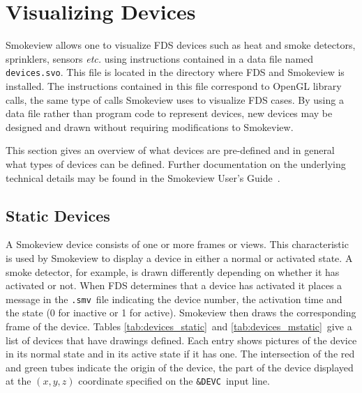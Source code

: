 %
%
\newcommand{\devicewidth}{1.5in}
\newcommand{\boxwidth}{2.5in}
\newcommand{\incgraphics}[1]{
\parbox[c]{\devicewidth}{
\vspace{0.01in}
\texttt{[image: \#1]}
\vspace{0.01in}
}
}


\section{Visualizing Devices}

Smokeview allows one to visualize FDS devices such as heat and smoke detectors,
sprinklers, sensors {\em etc.} using instructions contained in a
data file named {\tt devices.svo}.
This file is located in the directory where FDS and Smokeview is installed.
The instructions contained in this file correspond to OpenGL library calls,
the same type of calls Smokeview uses to visualize FDS cases.
By using a data file rather than program code to represent devices, new
devices may be designed and drawn without requiring modifications to Smokeview.



This section gives an overview of what devices are pre-defined and in general what types of devices can be defined.  Further documentation on the underlying technical details may be found in the Smokeview User's Guide~\cite{Smokeview_Users_Guide_5}.

\subsection{Static Devices}

A Smokeview device consists of one or more frames or views.  This characteristic is used by Smokeview to display a device in either a normal or activated state.  A smoke detector, for example, is drawn differently depending on whether it has activated or not.  When FDS determines that a device has activated it places a message in the {\tt .smv}\ file indicating the device number, the activation time and the state (0 for inactive or 1 for active).  Smokeview then draws the corresponding frame of the device.
Tables \ref{tab:devices_static}\ and \ref{tab:devices_mstatic}\
give a list of devices that have drawings defined.  Each entry shows pictures of the device in its normal state and in its active state if it has one.  The intersection of the red and green tubes indicate the origin of the device, the part of the device displayed at the $(x,y,z)$ coordinate specified on the {\tt \&DEVC}\ input line.

